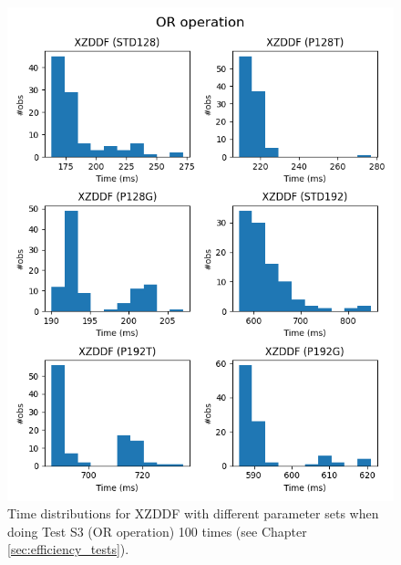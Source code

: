 \begin{figure}[ht]
    \centering
    \includegraphics[width=\textwidth]{data/figures/OR_operation_distributions_2.png}
    \caption{Time distributions for XZDDF with different parameter sets when doing Test S3 (OR operation) 100 times (see Chapter \ref{sec:efficiency_tests}).}
    \label{fig:distr_or2}
\end{figure}


